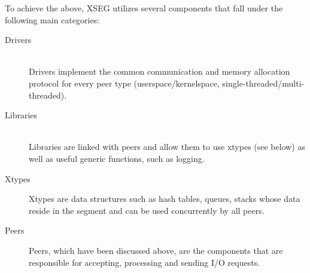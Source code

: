 To achieve the above, XSEG utilizes several components that fall under the 
following main categories:

\begin{description}
	\item[Drivers] \hfill \\
		Drivers implement the common communication and memory allocation 
		protocol for every peer type (userspace/kernelspace, 
		single-threaded/multi-threaded).
	\item[Libraries] \hfill \\
		Libraries are linked with peers and allow them to use xtypes (see 
		below) as well as useful generic functions, such as logging.
	\item[Xtypes]
		Xtypes are data structures such as hash tables, queues, stacks whose 
		data reside in the segment and can be used concurrently by all peers.
	\item[Peers]
		Peers, which have been discussed above, are the components that are 
		responsible for accepting, processing and sending I/O requests.
\end{description}

